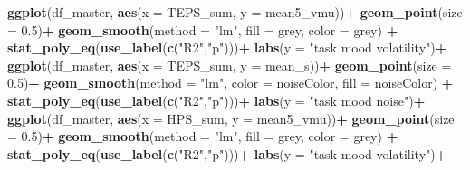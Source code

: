 \documentclass[
]{article}
\newenvironment{Shaded}{\begin{snugshade}}{\end{snugshade}}
\newcommand{\AttributeTok}[1]{\textcolor[rgb]{0.13,0.29,0.53}{#1}}
\newcommand{\FloatTok}[1]{\textcolor[rgb]{0.00,0.00,0.81}{#1}}
\newcommand{\FunctionTok}[1]{\textcolor[rgb]{0.13,0.29,0.53}{\textbf{#1}}}
\newcommand{\NormalTok}[1]{#1}
\newcommand{\SpecialCharTok}[1]{\textcolor[rgb]{0.81,0.36,0.00}{\textbf{#1}}}
\newcommand{\StringTok}[1]{\textcolor[rgb]{0.31,0.60,0.02}{#1}}
\begin{document}
\begin{Shaded}
\begin{Highlighting}[]
\FunctionTok{ggplot}\NormalTok{(df\_master, }\FunctionTok{aes}\NormalTok{(}\AttributeTok{x =}\NormalTok{ TEPS\_sum, }\AttributeTok{y =}\NormalTok{ mean5\_vmu))}\SpecialCharTok{+}
  \FunctionTok{geom\_point}\NormalTok{(}\AttributeTok{size =} \FloatTok{0.5}\NormalTok{)}\SpecialCharTok{+}
  \FunctionTok{geom\_smooth}\NormalTok{(}\AttributeTok{method =} \StringTok{"lm"}\NormalTok{, }\AttributeTok{fill =} \StringTok{\textquotesingle{}grey\textquotesingle{}}\NormalTok{, }\AttributeTok{color =} \StringTok{\textquotesingle{}grey\textquotesingle{}}\NormalTok{) }\SpecialCharTok{+}
  \FunctionTok{stat\_poly\_eq}\NormalTok{(}\FunctionTok{use\_label}\NormalTok{(}\FunctionTok{c}\NormalTok{(}\StringTok{"R2"}\NormalTok{,}\StringTok{"p"}\NormalTok{)))}\SpecialCharTok{+}
  \FunctionTok{labs}\NormalTok{(}\AttributeTok{y =} \StringTok{"task mood volatility"}\NormalTok{)}\SpecialCharTok{+}
\FunctionTok{ggplot}\NormalTok{(df\_master, }\FunctionTok{aes}\NormalTok{(}\AttributeTok{x =}\NormalTok{ TEPS\_sum, }\AttributeTok{y =}\NormalTok{ mean\_s))}\SpecialCharTok{+}
  \FunctionTok{geom\_point}\NormalTok{(}\AttributeTok{size =} \FloatTok{0.5}\NormalTok{)}\SpecialCharTok{+}
  \FunctionTok{geom\_smooth}\NormalTok{(}\AttributeTok{method =} \StringTok{"lm"}\NormalTok{, }\AttributeTok{color =}\NormalTok{ noiseColor, }\AttributeTok{fill =}\NormalTok{ noiseColor) }\SpecialCharTok{+}
  \FunctionTok{stat\_poly\_eq}\NormalTok{(}\FunctionTok{use\_label}\NormalTok{(}\FunctionTok{c}\NormalTok{(}\StringTok{"R2"}\NormalTok{,}\StringTok{"p"}\NormalTok{)))}\SpecialCharTok{+}
  \FunctionTok{labs}\NormalTok{(}\AttributeTok{y =} \StringTok{"task mood noise"}\NormalTok{)}\SpecialCharTok{+}
\FunctionTok{ggplot}\NormalTok{(df\_master, }\FunctionTok{aes}\NormalTok{(}\AttributeTok{x =}\NormalTok{ HPS\_sum, }\AttributeTok{y =}\NormalTok{ mean5\_vmu))}\SpecialCharTok{+}
  \FunctionTok{geom\_point}\NormalTok{(}\AttributeTok{size =} \FloatTok{0.5}\NormalTok{)}\SpecialCharTok{+}
  \FunctionTok{geom\_smooth}\NormalTok{(}\AttributeTok{method =} \StringTok{"lm"}\NormalTok{, }\AttributeTok{fill =} \StringTok{\textquotesingle{}grey\textquotesingle{}}\NormalTok{, }\AttributeTok{color =} \StringTok{\textquotesingle{}grey\textquotesingle{}}\NormalTok{) }\SpecialCharTok{+}
  \FunctionTok{stat\_poly\_eq}\NormalTok{(}\FunctionTok{use\_label}\NormalTok{(}\FunctionTok{c}\NormalTok{(}\StringTok{"R2"}\NormalTok{,}\StringTok{"p"}\NormalTok{)))}\SpecialCharTok{+}
  \FunctionTok{labs}\NormalTok{(}\AttributeTok{y =} \StringTok{"task mood volatility"}\NormalTok{)}\SpecialCharTok{+}

\end{Highlighting}
\end{Shaded}
\end{document}
